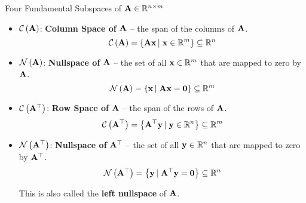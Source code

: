 \documentclass[aspectratio=169]{beamer}
\let\olditem\item
\renewcommand{\item}{\setlength{\itemsep}{\fill}\olditem}
\def\mf{\ensuremath\mathbf}
\def\mb{\ensuremath\mathbb}
\begin{document}
\begin{frame}[t]{Four Fundamental Subspaces of $\mf{A} \in \mb{R}^{n \times m}$}
\begin{itemize}
    \item $\mathcal{C}\left(\mf{A}\right)$: \textbf{Column Space of} $\mf{A}$ -- the span of the columns of $\mf{A}$.
    \[ \mathcal{C}\left(\mf{A}\right) = \left\{\mf{Ax} \left|\right. \mf{x} \in \mathbb{R}^m\right\} \subseteq \mathbb{R}^n \]

    \item $\mathcal{N}\left(\mf{A}\right)$: \textbf{Nullspace of} $\mf{A}$ -- the set of all $\mf{x} \in \mathbb{R}^m$ that are mapped to zero by $\mf{A}$.
    \[ \mathcal{N}\left(\mf{A}\right) = \left\{\mf{x} \left|\right. \mf{Ax}  = \mf{0}\right\} \subseteq \mathbb{R}^m \]
    
    \item $\mathcal{C}\left(\mf{A}^{\top}\right)$: \textbf{Row Space of} $\mf{A}$ -- the span of the rows of $\mf{A}$.
    \[ \mathcal{C}\left(\mf{A}^{\top}\right) = \left\{\mf{A}^{\top}\mf{y} \left|\right. \mf{y} \in \mathbb{R}^n\right\} \subseteq \mathbb{R}^m \]

    \item $\mathcal{N}\left(\mf{A}^{\top}\right)$: \textbf{Nullspace of} $\mf{A}^{\top}$ -- the set of all $\mf{y} \in \mathbb{R}^n$ that are mapped to zero by $\mf{A}^{\top}$.
    \[ \mathcal{N}\left(\mf{A}^{\top}\right) = \left\{\mf{y} \left|\right. \mf{A}^{\top}\mf{y}  = \mf{0}\right\} \subseteq \mathbb{R}^n \]

    This is also called the \textbf{left nullspace} of $\mf{A}$.
\end{itemize}
\end{frame}
\end{document}
